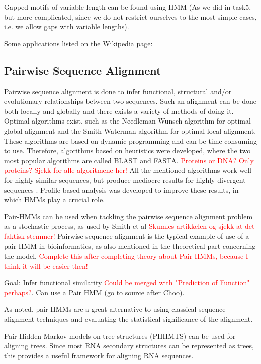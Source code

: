 \documentclass{article}
\begin{document}
Gapped motifs of variable length can be found using HMM (As we did in task5, but more complicated, since we do not restrict ourselves to the most simple cases, i.e. we allow gaps with variable lengths). 

Some applications listed on the Wikipedia page: 

\subsection{Pairwise Sequence Alignment}
Pairwise sequence alignment is done to infer functional, structural and/or evolutionary relationships between two sequences. Such an alignment can be done both locally and globally and there exists a variety of methods of doing it. Optimal algorithms exist, such as the Needleman-Wunsch algorithm for optimal global alignment and the Smith-Waterman algorithm for optimal local alignment. These algorithms are based on dynamic programming and can be time consuming to use. Therefore, algorithms based on heuristics were developed, where the two most popular algorithms are called BLAST and FASTA. \textcolor{red}{Proteins or DNA? Only proteins? Sjekk for alle algoritmene her!} All the mentioned algorithms work well for highly similar sequences, but produce mediocre results for highly divergent sequences \cite{Choo2004}. Profile based analysis was developed to improve these results, in which HMMs play a crucial role. 

Pair-HMMs can be used when tackling the pairwise sequence alignment problem as a stochastic process, as used by Smith et al \cite{Smith2003} \textcolor{red}{Skumles artikkelen og sjekk at det faktisk stemmer!} Pairwise sequence alignment is the typical example of use of a pair-HMM in bioinformatics, as also mentioned in the theoretical part concerning the model. \textcolor{red}{Complete this after completing theory about Pair-HMMs, because I think it will be easier then!}

Goal: Infer functional similarity \textcolor{red}{Could be merged with "Prediction of Function" perhaps?}. Can use a Pair HMM \cite{Choo2004} (go to source after Choo). 

As noted, pair HMMs are a great alternative to using classical sequence alignment techniques and evaluating the statistical significance of the alignment. 

Pair Hidden Markov models on tree structures (PHHMTS) can be used for aligning trees. Since most RNA secondary structures can be represented as trees, this provides a useful framework for aligning RNA sequences. 
\end{document}
